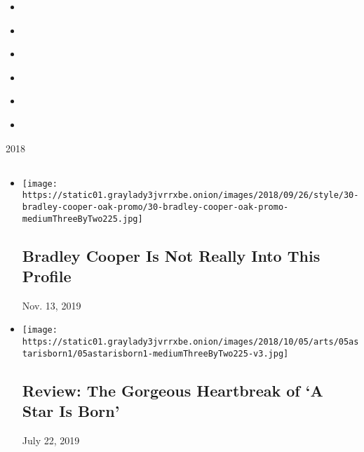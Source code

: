 \begin{itemize}
\tightlist
\item
  \href{https://www.nytimes3xbfgragh.onion/interactive/2018/10/03/magazine/lady-gaga-movie-star-is-born.html}{}
\item
  \href{https://www.nytimes3xbfgragh.onion/interactive/2018/10/03/magazine/morality-social-justice-art-entertainment.html}{}
\item
  \href{https://www.nytimes3xbfgragh.onion/interactive/2018/10/04/magazine/good-place-michael-schur-philosophy.html}{}
\item
  \href{https://www.nytimes3xbfgragh.onion/interactive/2018/10/04/magazine/barry-jenkins-james-baldwin-if-beale-street-could-talk.html}{}
\item
  \href{https://www.nytimes3xbfgragh.onion/interactive/2018/10/05/magazine/instagram-cindy-sherman-ugly-beauty.html}{}
\item
  \href{https://www.nytimes3xbfgragh.onion/interactive/2018/10/05/magazine/culture-moments-2018.html}{}
\end{itemize}

2018

\subsection{}

\begin{itemize}
\item
  \href{https://www.nytimes3xbfgragh.onion/2018/09/27/movies/bradley-cooper-a-star-is-born.html}{}

  \texttt{[image: https://static01.graylady3jvrrxbe.onion/images/2018/09/26/style/30-bradley-cooper-oak-promo/30-bradley-cooper-oak-promo-mediumThreeByTwo225.jpg]}

  \hypertarget{bradley-cooper-is-not-really-into-this-profile}{%
  \subsection{Bradley Cooper Is Not Really Into This
  Profile}\label{bradley-cooper-is-not-really-into-this-profile}}

  Nov. 13, 2019
\item
  \href{https://www.nytimes3xbfgragh.onion/2018/10/03/movies/a-star-is-born-review-lady-gaga-bradley-cooper.html}{}

  \texttt{[image: https://static01.graylady3jvrrxbe.onion/images/2018/10/05/arts/05astarisborn1/05astarisborn1-mediumThreeByTwo225-v3.jpg]}

  \hypertarget{review-the-gorgeous-heartbreak-of-a-star-is-born}{%
  \subsection{Review: The Gorgeous Heartbreak of `A Star Is
  Born'}\label{review-the-gorgeous-heartbreak-of-a-star-is-born}}

  July 22, 2019
\end{itemize}

